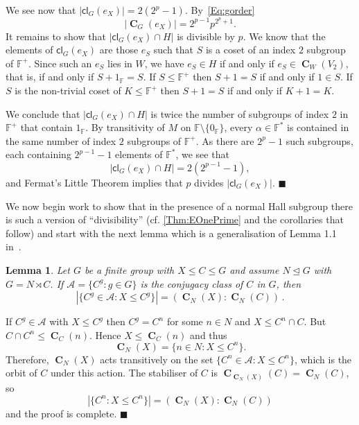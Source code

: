 \documentclass[10pt,a4paper]{amsart}
\numberwithin{equation}{section}
\DeclareMathOperator{\cent}{\mathbf{C}}
\newcommand{\card}[1]{\left\lvert{#1}\right\rvert}
\renewcommand{\leq}{\leqslant}
\newenvironment{proofof}{{\bf {Proof.} }}{\hfill $\blacksquare$ \\}
\def\ff{{\mathbb F}}
\def\cl{{\mathsf{c}\mathsf{l}}}
\newtheorem{lemma}[theorem]{Lemma}
\begin{document}
\begin{proofof}
We see now that $|\cl_G(e_X)| = 2(2^p-1)$.  
By~\eqref{Eq:gorder}
\[
\card{\cent_G(e_X)} = 2^{p-1} p^{2^p+1}.
\]
It remains to show that $\card{\cl_G(e_X) \cap H}$ is divisible by $p$.  
We know that the elements of $\cl_G(e_X)$ are those $e_S$ 
such that $S$ is a coset of an index $2$ subgroup of $\ff^+$.  
Since such an $e_S$ lies in $W$, 
we have $e_S \in H$ if and only if $e_S \in \cent_W(V_2)$, 
that is, if and only if $S + 1_\ff = S$.  
If $S \leq \ff^+$ then $S + 1 = S$ if and only if $1 \in S$.  
If $S$ is the non-trivial coset of $K \leq \ff^+$ then $S+1=S$ if and only if $K + 1 = K$.

We conclude that $\card{\cl_G(e_X) \cap H}$ 
is twice the number of subgroups of index $2$ in $\ff^+$ that contain $1_\ff$.  
By transitivity of $M$ on $\ff \setminus \{0_\ff\}$, 
every $\alpha \in \ff^\ast$ is contained in the same number of index $2$ subgroups of $\ff^+$.  
As there are $2^p-1$ such subgroups, 
each containing $2^{p-1}-1$ elements of $\ff^\ast$, 
we see that
\[
\card{\cl_G(e_X) \cap H} = 2(2^{p-1}-1),
\]
and Fermat's Little Theorem implies that $p$ divides $\card{\cl_G(e_X)}$. 
\end{proofof}




We now begin work to show that in the presence of a normal Hall subgroup
there is such a version of \enquote{divisibility}  
(cf. \autoref{Thm:EOnePrime} and the corollaries that follow) 
and start with the next lemma which is a generalisation of Lemma 1.1 in~\cite{arithmetical_questions}.

 
\begin{lemma}\label{Lem:CarterSemidirect}
Let $G$ be a finite group with $X \leq C \leq G$ and assume $N \unlhd G$ with $G = N \rtimes  C$. 
If $\mathcal{A} = \{ C^g : g \in G\}$ is the conjugacy class of $C$ in $G$, then 
\[
\card{\{ C^g \in \mathcal{A} : X \leq C^g\}} = (\cent_N(X) : \cent_N(C))\,. 
\]
\end{lemma}

\begin{proofof}
If $C^g \in \mathcal{A}$ with $X \leq C^g$ 
then  $C^g = C^n$ for some $n \in N$ and $X \leq C^n \cap C$. 
But $C \cap C^n \leq \cent_C(n)$.  
Hence  $X \leq \cent_C(n)$ and thus 
\[
\cent_N(X) = \{n \in N : X \leq C^n\}.
\] 
Therefore, $\cent_N(X)$ acts transitively on the set  $\{C^n \in \mathcal{A} : X \leq C^n\}$, 
which is the orbit of $C$ under this action. 
The stabiliser of $C$ is $\cent_{\cent_N(X)}(C) = \cent_N(C)$,
so 
\[
\card{\{C^n : X \leq C^n \}} = (\cent_N(X) : \cent_N(C))
\]
and the proof is complete. 
\end{proofof}
\end{document}
